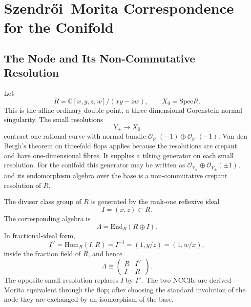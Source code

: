 
\providecommand{\CoHA}{\mathrm{CoHA}}
\providecommand{\Hom}{\mathrm{Hom}}
\providecommand{\End}{\mathrm{End}}
\providecommand{\Spec}{\mathrm{Spec}}
\providecommand{\Coh}{\mathrm{Coh}}
\providecommand{\Mod}{\text{-}\mathrm{Mod}}
\providecommand{\modd}{\text{-}\mathrm{mod}}
\providecommand{\Db}{D^{b}}
\providecommand{\DT}{\mathrm{DT}}
\providecommand{\cO}{\mathcal O}
\providecommand{\bP}{\mathbb P}
\providecommand{\bC}{\mathbb C}

\section*{Szendr\H{o}i--Morita Correspondence for the Conifold}

\subsection*{The Node and Its Non-Commutative Resolution}

Let
\[
  R=\bC[x,y,z,w]/(xy-zw),\qquad X_0=\Spec R .
\]
This is the affine ordinary double point, a three-dimensional
Gorenstein normal singularity.  The small resolutions
\[
  Y_{\pm}\longrightarrow X_0
\]
contract one rational curve with normal bundle
\(\cO_{\bP^1}(-1)\oplus\cO_{\bP^1}(-1)\).  Van den Bergh's theorem on
threefold flops applies because the resolutions are crepant and have
one-dimensional fibres.  It supplies a tilting generator on each small
resolution.
For the conifold this generator may be written as
\(\cO_{Y_{\pm}}\oplus\cO_{Y_{\pm}}(\pm 1)\), and its endomorphism
algebra over the base is a non-commutative crepant resolution of \(R\).

The divisor class group of \(R\) is generated by the rank-one reflexive
ideal
\[
  I=(x,z)\subset R .
\]
The corresponding algebra is
\[
  \Lambda=\End_R(R\oplus I).
\]
In fractional-ideal form,
\[
  I^\vee=\Hom_R(I,R)=I^{-1}=(1,y/z)=(1,w/x),
\]
inside the fraction field of \(R\), and hence
\[
  \Lambda\cong
  \begin{pmatrix}
    R & I^\vee\\
    I & R
  \end{pmatrix}.
\]
The opposite small resolution replaces \(I\) by \(I^\vee\).  The two
NCCRs are derived Morita equivalent through the flop; after choosing the
standard involution of the node they are exchanged by an isomorphism of
the base.

